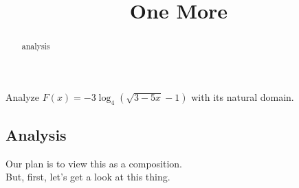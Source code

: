 \documentclass{ximera}
\title{One More}
\begin{document}
\begin{abstract}
analysis
\end{abstract}
\maketitle












Analyze $F(x) = -3 \log_4(\sqrt{3 - 5x} - 1)$ with its natural domain. \\




\subsection*{Analysis}





Our plan is to view this as a composition. \\



But, first, let's get a look at this thing. \\
\end{document}
